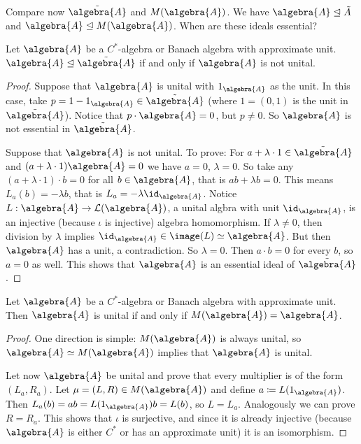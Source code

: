\documentclass[a4paper]{article}
\begin{document}
Compare now $\tilde{\algebra{A}}$ and $M(\algebra{A})$.
We have $\algebra{A} \trianglelefteq \tilde{A}$ and $\algebra{A} \trianglelefteq M(\algebra{A})$.
When are these ideals essential?

\begin{lemma}
	Let $\algebra{A}$ be a $C^*$-algebra or Banach algebra with approximate unit. 
	$\algebra{A} \trianglelefteq \tilde{\algebra{A}}$ if and only if $\algebra{A}$ is not unital.
\end{lemma}

\begin{proof}
	Suppose that $\algebra{A}$ is unital with $1_\algebra{A}$ as the unit.
	In this case, take $p = 1 - 1_\algebra{A} \in \tilde{\algebra{A}}$ (where $1 = (0,1)$ is the unit in $\tilde{\algebra{A}}$).
	Notice that $p \cdot \algebra{A} = 0$, but $p \neq 0$.
	So $\algebra{A}$ is not essential in $\tilde{\algebra{A}}$.

	Suppose that $\algebra{A}$ is not unital.
	To prove: For $a + \lambda \cdot 1 \in \tilde{\algebra{A}}$ and $(a + \lambda \cdot 1) \algebra{A} = 0$ we have $a = 0$, $\lambda = 0$.
	So take any $(a + \lambda \cdot 1) \cdot b = 0$ for all $b \in \algebra{A}$, that is $ab + \lambda b = 0$.
	This means  $L_a(b) = - \lambda b$, that is $L_a = - \lambda \id_\algebra{A}$.
	Notice $L: \algebra{A} \to \mathcal{L}(\algebra{A})$, a unital algbra with unit $\id_\algebra{A}$, is an injective (because $\iota$ is injective) algebra homomorphism.
	If $\lambda \neq 0$, then division by $\lambda$ implies $\id_\algebra{A} \in \image(L) \simeq \algebra{A}$.
	But then $\algebra{A}$ has a unit, a contradiction.
	So $\lambda = 0$.
	Then $a \cdot b = 0$ for every $b$, so $a = 0$ as well.
	This shows that $\algebra{A}$ is an essential ideal of $\tilde{\algebra{A}}$.
\end{proof}

\begin{remark}
	Let $\algebra{A}$ be a $C^*$-algebra or Banach algebra with approximate unit.
	Then $\algebra{A}$ is unital if and only if $M(\algebra{A}) = \algebra{A}$.
\end{remark}

\begin{proof}
	One direction is simple: $M(\algebra{A})$ is always unital, so $\algebra{A} \simeq M(\algebra{A})$ implies that $\algebra{A}$ is unital.

	Let now $\algebra{A}$ be unital and prove that every multiplier is of the form $(L_a, R_a)$. 
	Let $\mu = (L,R) \in M(\algebra{A})$ and define $a \coloneq L(1_\algebra{A})$.
	Then $L_a(b) = ab = L(1_\algebra{A}) b = L(b)$, so $L = L_a$.
	Analogously we can prove $R = R_a$.
	This shows that $\iota$ is surjective, and since it is already injective (because $\algebra{A}$ is either $C^*$ or has an approximate unit) it is an isomorphism.
\end{proof}
\end{document}

